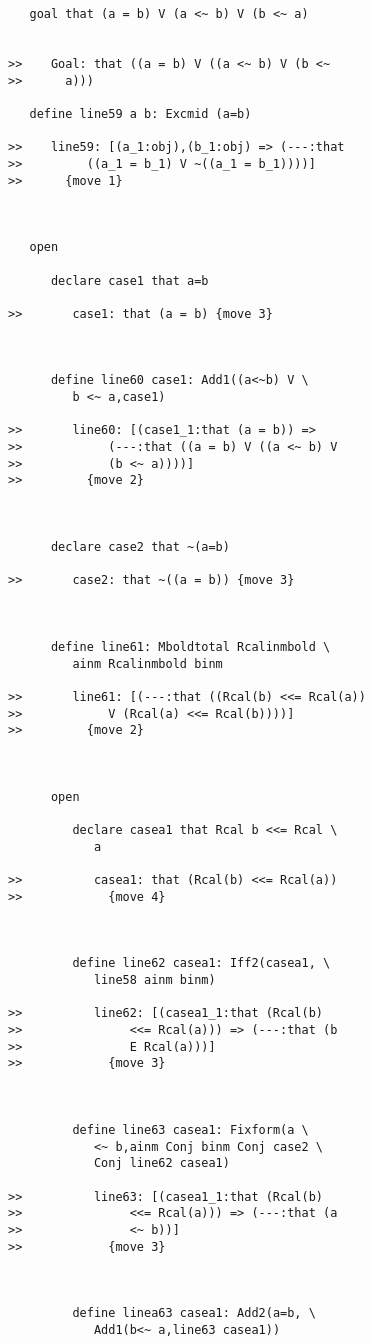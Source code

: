 \documentclass[12pt]{article}
\begin{document}
\begin{verbatim}
   goal that (a = b) V (a <~ b) V (b <~ a)


>>    Goal: that ((a = b) V ((a <~ b) V (b <~
>>      a)))

   define line59 a b: Excmid (a=b)

>>    line59: [(a_1:obj),(b_1:obj) => (---:that
>>         ((a_1 = b_1) V ~((a_1 = b_1))))]
>>      {move 1}



   open

      declare case1 that a=b

>>       case1: that (a = b) {move 3}



      define line60 case1: Add1((a<~b) V \
         b <~ a,case1)

>>       line60: [(case1_1:that (a = b)) =>
>>            (---:that ((a = b) V ((a <~ b) V
>>            (b <~ a))))]
>>         {move 2}



      declare case2 that ~(a=b)

>>       case2: that ~((a = b)) {move 3}



      define line61: Mboldtotal Rcalinmbold \
         ainm Rcalinmbold binm

>>       line61: [(---:that ((Rcal(b) <<= Rcal(a))
>>            V (Rcal(a) <<= Rcal(b))))]
>>         {move 2}



      open

         declare casea1 that Rcal b <<= Rcal \
            a

>>          casea1: that (Rcal(b) <<= Rcal(a))
>>            {move 4}



         define line62 casea1: Iff2(casea1, \
            line58 ainm binm)

>>          line62: [(casea1_1:that (Rcal(b)
>>               <<= Rcal(a))) => (---:that (b
>>               E Rcal(a)))]
>>            {move 3}



         define line63 casea1: Fixform(a \
            <~ b,ainm Conj binm Conj case2 \
            Conj line62 casea1)

>>          line63: [(casea1_1:that (Rcal(b)
>>               <<= Rcal(a))) => (---:that (a
>>               <~ b))]
>>            {move 3}



         define linea63 casea1: Add2(a=b, \
            Add1(b<~ a,line63 casea1))


\end{verbatim}
\end{document}
